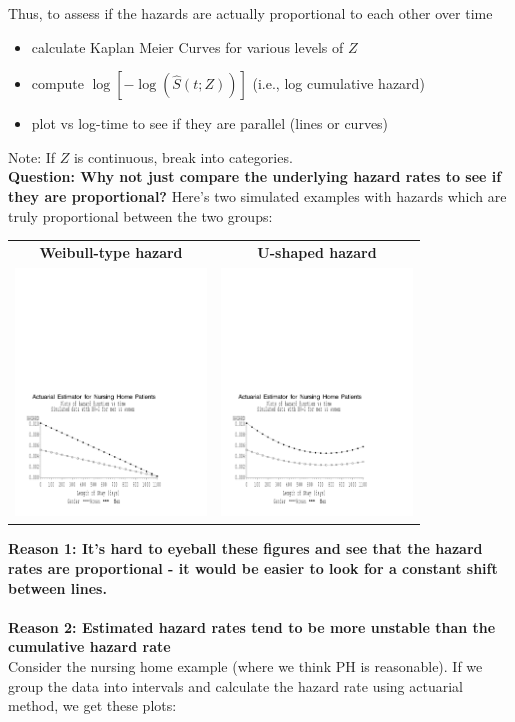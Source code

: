 \documentclass[11pt,psfig]{book}
\begin{document}
Thus, to assess if the hazards are actually proportional to each other
over time
\begin{itemize}
\item  calculate Kaplan Meier Curves for various levels of $Z$
\item  compute $\log[-\log(\hat{S}(t;Z))]$ (i.e., log cumulative hazard)
\item  plot vs log-time to see if they are parallel (lines or curves)
\end{itemize}
Note:  If $Z$ is continuous, break into categories.
\\[2ex]
{\bf Question:  Why not just compare the underlying hazard rates to
see if they are proportional?}
\newpage
\noindent
Here's two simulated examples with hazards which are truly
proportional between the two groups:\\
\vspace*{-1em}
\begin{center}
\begin{tabular}{cc}
{\bf Weibull-type hazard} & {\bf U-shaped hazard}\\
\includegraphics[width=2in]{hazards_sim1.pdf} &
\includegraphics[width=2in]{hazards_sim2.pdf}
\end{tabular}
\end{center}
\noindent
{\bf Reason 1:  It's hard to eyeball these figures and see that
the hazard rates are proportional - it would be easier to look for
a constant shift between lines.}\\
\\
{\bf Reason 2: Estimated hazard rates tend to be more unstable than the
cumulative hazard rate}
\\[2ex]
Consider the nursing home example (where we think PH is reasonable).
If we group the data into intervals and calculate the hazard rate using
actuarial method, we get these plots:
\end{document}
